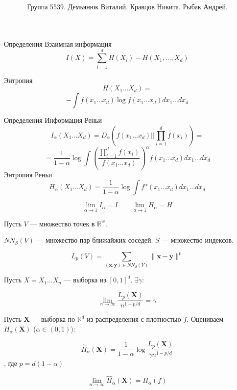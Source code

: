 \documentclass[14pt]{beamer}
\title{
}
\institute{Университет ИТМО}
\author{ Группа 5539. 
Демьянюк Виталий.
Кравцов Никита.
Рыбак Андрей.}
\date{}
\begin{document}
{
\fontsize{14pt}{14pt}\selectfont
{}
\begin{frame}
    \maketitle
\end{frame}
}
\begin{frame}{Определения}
Взаимная информация
$$
I(X) = \sum\limits_{i=1}^{d} H(X_i) - H(X_1, \dots, X_d) 
$$


Энтропия
$$
H(X_1 \dots X_d) =
$$
$$
- \int f (x_1 \dots x_d) \log f (x_1 \dots x_d) d x_1 \dots d x_d
$$
\end{frame}
\begin{frame}{Определения}
Информация Реньи
$$
I_{\alpha}  (X_1 \dots X_d)  = D_{\alpha}
\left ( f(x_1 \dots x_d) || \prod\limits_{i=1}^d f(x_i) \right ) =
$$
$$
= \frac{1}{1-\alpha} \log \int
\left ( \frac {\prod_{i=1}^d f(x_i)} {f(x_1 \dots x_d)} \right )^{\alpha}
f(x_1 \dots x_d) d x_1 \dots d x_d
$$
Энтропия Реньи
$$
H_{\alpha}  (X_1 \dots X_d) = \frac{1}{1-\alpha} \log \int
f^{\alpha} (x_1 \dots x_d)  dx_1 \dots dx_d
$$

$$
\lim_{\alpha \to 1} I_{\alpha} = I \quad \quad \lim_{\alpha \to 1} H_{\alpha} = H
$$
\end{frame}

\begin{frame}
    Пусть $V$ — множество точек в $\mathbb R^w$.
    
    $NN_S(V)$ — множество пар ближайжих соседей. $S$ — множество индексов.

    $$ L_p(V) = \sum\limits_{( \mathbf x,\mathbf y) \in NN_S(V)} \| \mathbf x - \mathbf y\|^p $$

    Пусть $ X = X_1 \dots X_n $ — выборка из $[0,1]^d$. $\exists \gamma : $

    $$\lim_{n\to\infty}\frac{L_p(\mathbf X)}{n^{1-p/d}}  = \gamma  $$

\end{frame}


\begin{frame}
    Пусть $ \mathbf X $ — выборка по $\mathbb R^d$ из распределения с плотностью $f$.
    Оцениваем $H_\alpha(\mathbf X)$ ($\alpha \in (0,1)$):

    $$ \widehat H_\alpha (\mathbf X) = \frac {1}{1-\alpha} \log \frac{L_p(\mathbf X) }{\gamma n^{1-p/d}}$$,
    где $p= d(1-\alpha) $

    $$\lim_{n\to \infty} \widehat H_\alpha (\mathbf X) = H_\alpha(f) $$
\end{frame}
\end{document}
